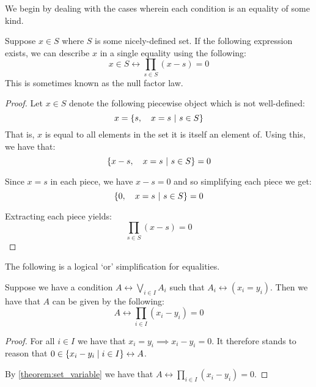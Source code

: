 We begin by dealing with the cases wherein each condition is an equality of some kind.
\begin{theorem}
    Suppose $x\in S$ where $S$ is some nicely-defined set. If the following expression exists, we can describe $x$ in a single equality using the following:
    $$
        x\in S\leftrightarrow \prod_{s\in S}{(x-s)}=0
    $$
    This is sometimes known as the null factor law.

    \begin{proof}
        \label{theorem:set_variable}
        Let $x\in S$ denote the following piecewise object which is not well-defined:
        $$
            x = \pwobj{s}{x=s}{s\in S}
        $$
        That is, $x$ is equal to all elements in the set it is itself an element of. Using this, we have that:
        $$
            \pwobj{x-s}{x=s}{s\in S}=0
        $$

        Since $x=s$ in each piece, we have $x-s=0$ and so simplifying each piece we get:
        $$
            \pwobj{0}{x=s}{s\in S}=0
        $$

        Extracting each piece yields:
        $$
            \prod_{s\in S}{(x-s)}=0
        $$
    \end{proof}
\end{theorem}
\begin{theorem}
    \label{theorem:logical_or_equality}
    The following is a logical `or' simplification for equalities.

    Suppose we have a condition $A\leftrightarrow \displaystyle\bigvee_{i\in I}{A_i}$ such that $A_i\leftrightarrow(x_i=y_i)$. Then we have that $A$ can be given by the following:
    $$
        A\leftrightarrow\prod_{i\in I}{(x_i-y_i)}=0
    $$

    \begin{proof}
        For all $i\in I$ we have that $x_i=y_i\implies x_i-y_i=0$. It therefore stands to reason that $0\in\br*{x_i-y_i\mid i\in I}\leftrightarrow A$.

        By \ref{theorem:set_variable} we have that $A\leftrightarrow \prod_{i\in I}{(x_i-y_i)}=0$.
    \end{proof}
\end{theorem}
